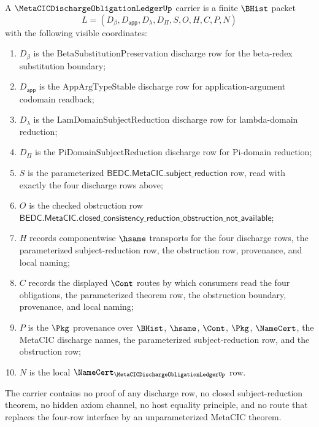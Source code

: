 \begin{definition}
\label{def:metacic-discharge-obligation-ledger-carrier}
A $\MetaCICDischargeObligationLedgerUp$ carrier is a finite $\BHist$ packet
$$
L=(D_\beta,D_{\mathsf{app}},D_\lambda,D_\Pi,S,O,H,C,P,N)
$$
with the following visible coordinates:
\begin{enumerate}
\item $D_\beta$ is the $\mathrm{BetaSubstitutionPreservation}$ discharge row for the beta-redex substitution boundary;
\item $D_{\mathsf{app}}$ is the $\mathrm{AppArgTypeStable}$ discharge row for application-argument codomain readback;
\item $D_\lambda$ is the $\mathrm{LamDomainSubjectReduction}$ discharge row for lambda-domain reduction;
\item $D_\Pi$ is the $\mathrm{PiDomainSubjectReduction}$ discharge row for Pi-domain reduction;
\item $S$ is the parameterized $\mathsf{BEDC.MetaCIC.subject\_reduction}$ row, read with exactly the four discharge rows above;
\item $O$ is the checked obstruction row $\mathsf{BEDC.MetaCIC.closed\_consistency\_reduction\_obstruction\_not\_available}$;
\item $H$ records componentwise $\hsame$ transports for the four discharge rows, the parameterized subject-reduction row, the obstruction row, provenance, and local naming;
\item $C$ records the displayed $\Cont$ routes by which consumers read the four obligations, the parameterized theorem row, the obstruction boundary, provenance, and local naming;
\item $P$ is the $\Pkg$ provenance over $\BHist$, $\hsame$, $\Cont$, $\Pkg$, $\NameCert$, the MetaCIC discharge names, the parameterized subject-reduction row, and the obstruction row;
\item $N$ is the local $\NameCert_{\MetaCICDischargeObligationLedgerUp}$ row.
\end{enumerate}
The carrier contains no proof of any discharge row, no closed subject-reduction theorem, no hidden axiom channel, no host equality principle, and no route that replaces the four-row interface by an unparameterized MetaCIC theorem.
\end{definition}

